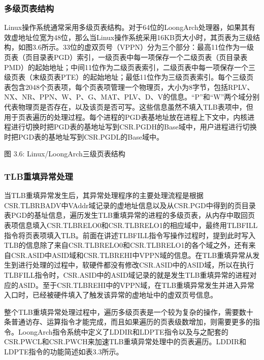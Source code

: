 \documentclass[]{ctexbook}
\begin{document}
\hypertarget{ux591aux7ea7ux9875ux8868ux7ed3ux6784}{%
\subsubsection{多级页表结构}\label{ux591aux7ea7ux9875ux8868ux7ed3ux6784}}

Linux操作系统通常采用多级页表结构。对于64位的LoongArch处理器，如果其有效虚地址位宽为48位，那么当Linux操作系统采用16KB页大小时，其页表为三级结构，如图3.6所示。33位的虚双页号（VPPN）分为三个部分：最高11位作为一级页表（页目录表PGD）索引，一级页表中每一项保存一个二级页表（页目录表PMD）的起始地址；中间11位作为二级页表索引，二级页表中每一项保存一个三级页表（末级页表PTE）的起始地址；最低11位作为三级页表索引。每个三级页表包含2048个页表项，每个页表项管理一个物理页，大小为8字节，包括RPLV、NX、NR、PPN、W、P、G、MAT、PLV、D、V的信息。``P''和``W''两个域分别代表物理页是否存在，以及该页是否可写。这些信息虽然不填入TLB表项中，但用于页表遍历的处理过程。每个进程的PGD表基地址放在进程上下文中，内核进程进行切换时把PGD表的基地址写到CSR.PGDH的Base域中，用户进程进行切换时把PGD表的基地址写到CSR.PGDL的Base域中。

图 3.6: Linux/LoongArch三级页表结构

\hypertarget{tlbux91cdux586bux5f02ux5e38ux5904ux7406}{%
\subsubsection{TLB重填异常处理}\label{tlbux91cdux586bux5f02ux5e38ux5904ux7406}}

当TLB重填异常发生后，其异常处理程序的主要处理流程是根据CSR.TLBRBADV中VAddr域记录的虚地址信息以及从CSR.PGD中得到的页目录表PGD的基址信息，遍历发生TLB重填异常的进程的多级页表，从内存中取回页表项信息填入CSR.TLBRELO0和CSR.TLBRELO1的相应域中，最终用TLBFILL指令将页表项填入TLB。前面在讲述TLBFILL指令写操作过程时，提到此时写入TLB的信息除了来自CSR.TLBRELO0和CSR.TLBRELO1的各个域之外，还有来自CSR.ASID中ASID域和CSR.TLBREHI中VPPN域的信息。在TLB重填异常从发生到进行处理的过程中，软硬件都没有修改CSR.ASID中的ASID域，所以在执行TLBFILL指令时，CSR.ASID中的ASID域记录的就是发生TLB重填异常的进程对应的ASID。至于CSR.TLBREHI中的VPPN域，在TLB重填异常发生并进入异常入口时，已经被硬件填入了触发该异常的虚地址中的虚双页号信息。

整个TLB重填异常处理过程中，遍历多级页表是一个较为复杂的操作，需要数十条普通访存、运算指令才能完成，而且如果遍历的页表级数增加，则需要更多的指令。LoongArch指令系统中定义了LDDIR和LDPTE指令以及与之配套的CSR.PWCL和CSR.PWCH来加速TLB重填异常处理中的页表遍历。LDDIR和LDPTE指令的功能简述如表3.3所示。
\end{document}
